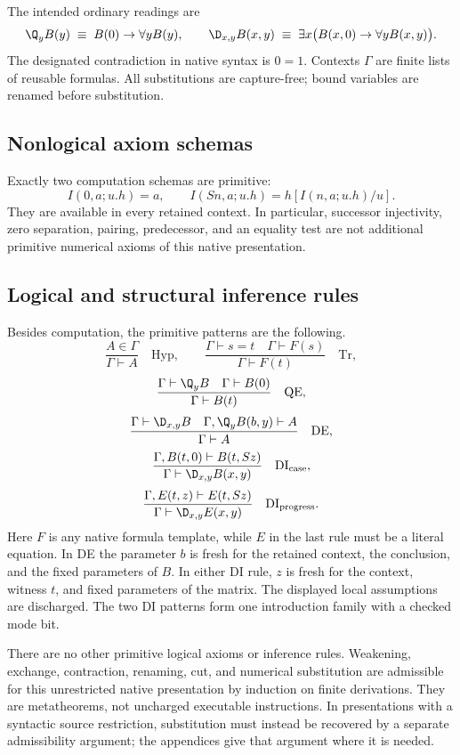 The intended ordinary readings are
\[
 \Q_yB(y)\;\equiv\;B(0)\to\forall y B(y),\qquad
 \D_{x,y}B(x,y)\;\equiv\;
 \exists x\bigl(B(x,0)\to\forall y B(x,y)\bigr).
\]
The designated contradiction in native syntax is $0=1$.
Contexts $\Gamma$ are finite lists of reusable formulas. All substitutions
are capture-free; bound variables are renamed before substitution.

\subsection{Nonlogical axiom schemas}

Exactly two computation schemas are primitive:
\[
 I(0,a;u.h)=a,\qquad
 I(Sn,a;u.h)=h[I(n,a;u.h)/u].
\tag{I0,IS}
\]
They are available in every retained context. In particular, successor
injectivity, zero separation, pairing, predecessor, and an equality test
are not additional primitive numerical axioms of this native presentation.

\subsection{Logical and structural inference rules}

Besides computation, the primitive patterns are the following.
\[
 \frac{A\in\Gamma}{\Gamma\vdash A}\quad\mathrm{Hyp},\qquad
 \frac{\Gamma\vdash s=t\quad\Gamma\vdash F(s)}
      {\Gamma\vdash F(t)}\quad\mathrm{Tr},
\]
\[
 \frac{\Gamma\vdash\Q_yB\quad\Gamma\vdash B(0)}
      {\Gamma\vdash B(t)}\quad\mathrm{QE},
\]
\[
 \frac{\Gamma\vdash\D_{x,y}B\quad
       \Gamma,\Q_yB(b,y)\vdash A}
      {\Gamma\vdash A}\quad\mathrm{DE},
\]
\[
 \frac{\Gamma,B(t,0)\vdash B(t,Sz)}
      {\Gamma\vdash\D_{x,y}B(x,y)}\quad\mathrm{DI}_{\rm case},
\]
\[
 \frac{\Gamma,E(t,z)\vdash E(t,Sz)}
      {\Gamma\vdash\D_{x,y}E(x,y)}\quad\mathrm{DI}_{\rm progress}.
\]
Here $F$ is any native formula template, while $E$ in the last rule must
be a literal equation. In DE the parameter $b$ is fresh for the retained
context, the conclusion, and the fixed parameters of $B$. In either DI
rule, $z$ is fresh for the context, witness $t$, and fixed parameters of the
matrix. The displayed local assumptions are discharged. The two DI
patterns form one introduction family with a checked mode bit.

There are no other primitive logical axioms or inference rules. Weakening,
exchange, contraction, renaming, cut, and numerical substitution are
admissible for this unrestricted native presentation by induction on
finite derivations. They are metatheorems, not uncharged executable
instructions. In presentations with a syntactic source restriction,
substitution must instead be recovered by a separate admissibility
argument; the appendices give that argument where it is needed.

